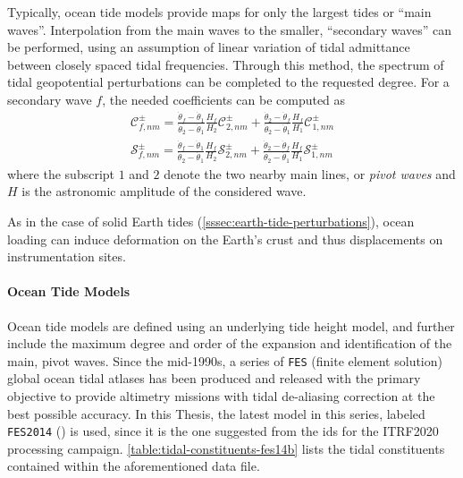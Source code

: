 Typically, ocean tide models provide maps for only the largest tides or ``main waves''. 
Interpolation from the main waves to the smaller, ``secondary waves'' can be performed, 
using an assumption of linear variation of tidal admittance between closely spaced 
tidal frequencies. Through this method, the spectrum of tidal geopotential perturbations 
can be completed to the requested degree. For a secondary wave $f$, the needed 
coefficients can be computed as
\begin{equation}\label{eq:iers10616}
  \begin{aligned}
    \mathcal{C}_{f,nm}^{\pm} = \frac{\dot{\theta}_f - \dot{\theta}_1}{\dot{\theta}_2 - 
        \dot{\theta}_1} \frac{H_f}{H_2} \mathcal{C}_{2,nm}^{\pm} 
        + \frac{\dot{\theta}_2 - \dot{\theta}_f}{\dot{\theta}_2 - \dot{\theta}_1}
        \frac{H_f}{H_1} \mathcal{C}_{1,nm}^{\pm} \\
    \mathcal{S}_{f,nm}^{\pm} = \frac{\dot{\theta}_f - \dot{\theta}_1}{\dot{\theta}_2 - \dot{\theta}_1} 
      \frac{H_f}{H_2} \mathcal{S}_{2,nm}^{\pm} 
      + \frac{\dot{\theta}_2 - \dot{\theta}_f}{\dot{\theta}_2 - \dot{\theta}_1} 
      \frac{H_f}{H_1} \mathcal{S}_{1,nm}^{\pm}
  \end{aligned}
\end{equation}
where the subscript $1$ and $2$ denote the two nearby main lines, or \emph{pivot waves} 
and $H$ is the astronomic amplitude of the considered wave.

As in the case of solid Earth tides (\autoref{sssec:earth-tide-perturbations}), 
ocean loading can induce deformation on the Earth's crust and thus displacements 
on instrumentation sites.

\paragraph{Ocean Tide Models}\label{par:ocean-tide-models}

Ocean tide models are defined using an underlying tide height model, and further 
include the  maximum degree and order of the expansion and identification of the 
main, pivot waves. Since the mid-1990s, a series of \texttt{FES} (finite element 
solution) global ocean tidal atlases has been produced and released with the primary 
objective to provide altimetry missions with tidal de-aliasing correction at the 
best possible accuracy. In this Thesis, the latest model in this series, labeled 
\texttt{FES2014} (\cite{Lyard2021}) is used, since it is the one suggested 
from the \gls{ids} for the ITRF2020 processing campaign. \autoref{table:tidal-constituents-fes14b} 
lists the tidal constituents contained within the aforementioned data file.

